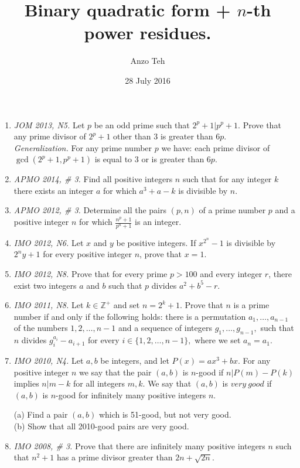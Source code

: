 \documentclass[11pt,a4paper]{article}
\begin{document}
\title{Binary quadratic form + $n$-th power residues.}
\author{Anzo Teh}
\date{28 July 2016}
\maketitle

\begin {enumerate}
\item \emph {JOM 2013, N5.} Let $p$ be an odd prime such that $2^p+1|p^p+1$. Prove that any prime divisor of $2^p+1$ other than $3$ is greater than $6p$.\\
\emph {Generalization.} For any prime number $p$ we have: each prime divisor of $\gcd(2^p+1,p^p+1)$ is equal to $3$ or is greater than $6p$.

\item\emph {APMO 2014, \# 3.} Find all positive integers $n$ such that for any integer $k$ there exists an integer $a$ for which $a^3+a-k$ is divisible by $n$.

\item\emph{APMO 2012, \# 3.}  Determine all the pairs $ (p , n )$ of a prime number $ p$ and a positive integer $ n$ for which $ \frac{ n^p + 1 }{p^n + 1} $ is an integer.

\item\emph{IMO 2012, N6.} Let $x$ and $y$ be positive integers. If ${x^{2^n}}-1$ is divisible by $2^ny+1$ for every positive integer $n$, prove that $x=1$.

\item\emph {IMO 2012, N8.} Prove that for every prime $p>100$ and every integer $r$, there exist two integers $a$ and $b$ such that $p$ divides $a^2+b^5-r$.

\item\emph {IMO 2011, N8.} Let $k \in \mathbb{Z}^+$ and set $n=2^k+1.$ Prove that $n$ is a prime number if and only if the following holds: there is a permutation $a_{1},\ldots,a_{n-1}$ of the numbers $1,2, \ldots, n-1$ and a sequence of integers $g_{1},\ldots,g_{n-1},$ such that $n$ divides $g^{a_i}_i - a_{i+1}$ for every $i \in \{1,2,\ldots,n-1\},$ where we set $a_n = a_1.$

\item\emph {IMO 2010, N4.} Let $a, b$ be integers, and let $P(x) = ax^3+bx.$ For any positive integer $n$ we say that the pair $(a,b)$ is $n$-good if $n | P(m)-P(k)$ implies $n | m - k$ for all integers $m, k.$ We say that $(a,b)$ is $very \ good$ if $(a,b)$ is $n$-good for infinitely many positive integers $n.$

    (a) Find a pair $(a,b)$ which is 51-good, but not very good.\\
    (b) Show that all 2010-good pairs are very good.

\item\emph {IMO 2008, \# 3.} Prove that there are infinitely many positive integers $ n$ such that $ n^{2} + 1$ has a prime divisor greater than $ 2n + \sqrt {2n}$.


\end{enumerate}
\end{document}
